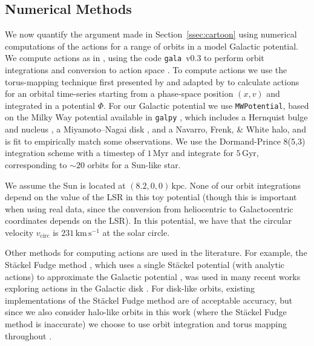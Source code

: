 \documentclass[twocolumn]{aastex62}
\newcommand{\kpc}{\text{kpc}}
\newcommand{\Myr}{\text{Myr}}
\newcommand{\Gyr}{\text{Gyr}}
\newcommand{\kms}{\text{km}\,\text{s}^{-1}}
\begin{document}
\subsection{Numerical Methods} \label{ssec:action_comp}
We now quantify the argument made in Section~\ref{ssec:cartoon} using
numerical computations of the actions for a range of orbits in a model
Galactic potential. We compute actions as in \citet{2018ApJ...867...31B},
using the code \texttt{gala}~v0.3 to perform orbit integrations and conversion
to action space \citep{gala, gala:zenodo}. To compute actions we use the
torus-mapping technique first presented by \citet{1990MNRAS.244..634M} and
adapted by \citet{2014MNRAS.441.3284S} to calculate actions for an orbital
time-series starting from a phase-space position $(x, v)$ and integrated in a
potential $\Phi$. For our Galactic potential we use \texttt{MWPotential},
based on the Milky Way potential available in \texttt{galpy}
\citep{2015ApJS..216...29B}, which includes a Hernquist bulge and nucleus
\citep{1990ApJ...356..359H}, a Miyamoto--Nagai disk
\citep{1975PASJ...27..533M}, and a Navarro, Frenk, \& White
\citeyear{1997ApJ...490..493N} halo, and is fit to empirically match some
observations. We use the Dormand-Prince 8(5,3) integration scheme
\citep{Dormand80:integrator} with a timestep of $1\,\Myr$ and integrate for
$5\,\Gyr$, corresponding to $\sim 20$ orbits for a Sun-like star.

We assume the Sun is located at $(8.2, 0, 0)\,\kpc$. None of our orbit
integrations depend on the value of the LSR in this toy potential (though this
is important when using real data, since the conversion from heliocentric to
Galactocentric coordinates depends on the LSR). In this potential, we have
that the circular velocity $v_{\text{circ}}$ is $231\,\kms$ at the solar
circle.

Other methods for computing actions are used in the literature. For example,
the St\"ackel Fudge method \citep{2016MNRAS.457.2107S}, which uses a single
St\"ackel potential (with analytic actions) to approximate the Galactic
potential \citep{1985MNRAS.216..273D, 2012MNRAS.426.1324B}, was used in many
recent works exploring actions in the Galactic disk
\citep[e.g.,][]{2019MNRAS.484.3291T, 2018MNRAS.481.4093S,
2018arXiv180803278T}. For disk-like orbits, existing implementations of the
St\"ackel Fudge method are of acceptable accuracy, but since we also consider
halo-like orbits in this work (where the St\"ackel Fudge method is inaccurate)
we choose to use orbit integration and torus mapping throughout
\citep{2016MNRAS.457.2107S}.
\end{document}
